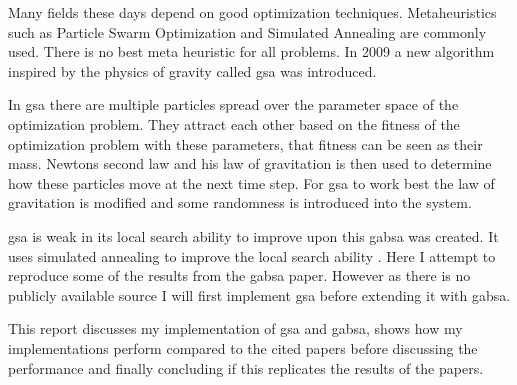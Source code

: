 Many fields these days depend on good optimization techniques. Metaheuristics such as Particle Swarm Optimization and Simulated Annealing are commonly used. There is no best meta heuristic for all problems. In 2009 a new algorithm inspired by the physics of gravity called \ac{gsa} was introduced\cite{GSA}. 

In \ac{gsa} there are multiple particles spread over the parameter space of the optimization problem. They attract each other based on the fitness of the optimization problem with these parameters, that fitness can be seen as their mass. Newtons second law and his law of gravitation is then used to determine how these particles move at the next time step. For \ac{gsa} to work best the law of gravitation is modified and some randomness is introduced into the system.

\ac{gsa} is weak in its local search ability to improve upon this \ac{gabsa} was created. It uses simulated annealing to improve the local search ability \cite{GABSA}. Here I attempt to reproduce some of the results from the \ac{gabsa} paper. However as there is no publicly available source I will first implement \ac{gsa} before extending it with \ac{gabsa}. 

This report discusses my implementation of \ac{gsa} and \ac{gabsa}, shows how my implementations perform compared to the cited papers before discussing the performance and finally concluding if this replicates the results of the papers.
